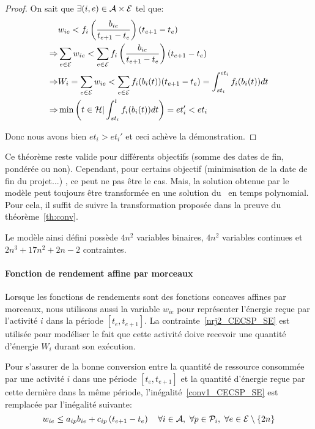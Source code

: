 \begin{proof}
On sait que $\exists (i,e) \in {\cal A} \times {\cal E}$ tel que:
\begin{align*}
  &w_{ie} < f_i\left(\frac{b_{ie}}{t_{e+1}-t_e}\right)(t_{e+1}-t_e)\\  
  \Rightarrow &\sum_{e \in  {\cal E}} w_{ie} < \sum_{e \in {\cal E}} f_i\left(
                \frac{b_{ie}}{t_{e+1}-t_e}\right)(t_{e+1}-t_e)\\ 
  \Rightarrow & W_i=\sum_{e \in  {\cal E}} w_{ie} < \sum_{e \in {\cal E}}
                f_i(b_i(t))(t_{e+1}-t_e)=\int_{st_i}^{et_i}
                f_i(b_i(t))dt \\
  \Rightarrow & \min\left(t \in {\cal H} |
                \int_{st_i}^{t}f_i(b_i(t))dt\right) = et_i' < et_i                 
\end{align*}

Donc nous avons bien $et_i > et_i'$ et ceci achève la démonstration.
\end{proof}

Ce théorème reste valide pour différents objectifs (somme des dates de
fin, pondérée ou non). Cependant, pour certains objectif (minimisation
de la date de fin du projet...) , ce peut ne pas être le cas. Mais, la
solution obtenue par le modèle peut toujours être transformée en une
solution du \CECSP~en temps polynomial. Pour cela, il suffit de suivre
la transformation proposée dans la preuve du théorème~\ref{th:conv}.

Le modèle ainsi défini possède $4n^2$ variables binaires, $4n^2$
variables continues et $2n^3+17n^2+2n-2$ contraintes.

\paragraph{Fonction de rendement affine par morceaux}

Lorsque les fonctions de rendements sont des fonctions concaves
affines par morceaux, nous utilisons aussi la variable $w_{ie}$ pour
représenter l'énergie reçue par l'activité $i$ dans la période
$[t_e,t_{e+1}]$. La contrainte~\eqref{nrj2_CECSP_SE} est utilisée pour
modéliser le fait que cette activité doive recevoir une quantité
d'énergie $W_i$ durant son exécution.

Pour s'assurer de la bonne conversion entre la quantité de ressource
consommée par une activité $i$ dans une période $[t_e,t_{e+1}]$ et la
quantité d'énergie reçue par cette dernière dans la même période,
l'inégalité~\eqref{conv1_CECSP_SE} est remplacée par l'inégalité
suivante:
\begin{equation}
w_{ie} \le a_{ip}b_{ie} + c_{ip}\left( t_{e+1} - t_e\right) \quad  
\forall i \in {\cal A},\ \forall p \in {\cal P}_i,\ \forall e \in {\cal E}\setminus\{2n\}  
\label{conv2_CECSP_SE}
\end{equation}


